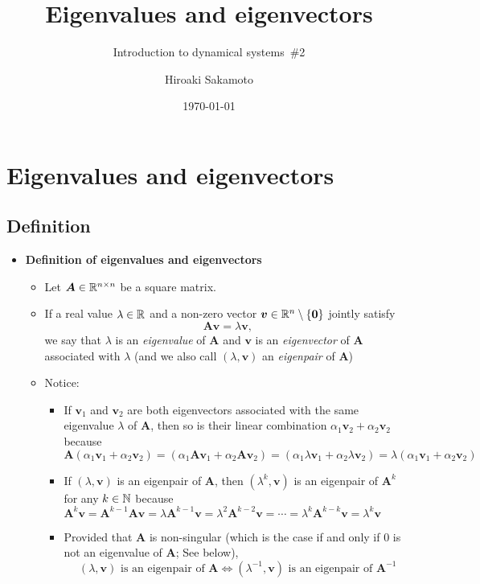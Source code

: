\documentclass[12pt,a4paper]{article}
\title{Eigenvalues and eigenvectors}
\subtitle{Introduction to dynamical systems~\#2}
\author{Hiroaki Sakamoto}
\date{\today}
\begin{document}
\maketitle
\tableofcontents

\section{Eigenvalues and eigenvectors}

\subsection{Definition}

\begin{itemize}

\item \textbf{Definition of eigenvalues and eigenvectors}
  \begin{itemize}
  \item Let $\bm{A}\in \mathbb{R}^{n\times n}$ be a square matrix.
  \item If a real value $\lambda\in \mathbb{R}$
    and a non-zero vector $\bm{v}\in\mathbb{R}^{n}\setminus\{\bm{0}\}$ jointly satisfy
    \begin{equation}\nonumber%
      \bm{A}\bm{v} = \lambda \bm{v},
    \end{equation}
    we say that $\lambda$ is an \emph{eigenvalue} of $\bm{A}$
    and $\bm{v}$ is an \emph{eigenvector} of $\bm{A}$ associated with $\lambda$
    (and we also call $(\lambda, \bm{v})$ an \emph{eigenpair} of $\bm{A}$)
  \item Notice:
    \begin{itemize}
    \item If $\bm{v}_{1}$ and $\bm{v}_{2}$ are both eigenvectors associated with the same eigenvalue $\lambda$ of $\bm{A}$,
      then so is their linear combination $\alpha_{1}\bm{v}_{2}+ \alpha_{2}\bm{v}_{2}$ because
      \begin{equation}\nonumber%
        \bm{A}\left(\alpha_{1}\bm{v}_{1}+ \alpha_{2}\bm{v}_{2}\right)
        = \left(\alpha_{1}\bm{A}\bm{v}_{1}+ \alpha_{2}\bm{A}\bm{v}_{2}\right)
        = \left(\alpha_{1}\lambda\bm{v}_{1}+ \alpha_{2}\lambda\bm{v}_{2}\right)
        = \lambda \left(\alpha_{1}\bm{v}_{1}+ \alpha_{2}\bm{v}_{2}\right)
      \end{equation}
    \item If $(\lambda, \bm{v})$ is an eigenpair of $\bm{A}$,
      then $(\lambda^{k}, \bm{v})$ is an eigenpair of $\bm{A}^{k}$ for any $k\in \mathbb{N}$
      because
      $\bm{A}^{k}\bm{v} = \bm{A}^{k-1}\bm{A}\bm{v}  = \lambda\bm{A}^{k-1}\bm{v} = \lambda^{2}\bm{A}^{k-2}\bm{v} = \cdots = \lambda^{k}\bm{A}^{k-k}\bm{v} = \lambda^{k}\bm{v}$
    \item Provided that $\bm{A}$ is non-singular (which is the case if and only if $0$ is not an eigenvalue of $\bm{A}$; See below),
      \begin{equation}\nonumber%
        \text{$(\lambda,\bm{v})$ is an eigenpair of $\bm{A}$}
        \iff
        \text{$(\lambda^{-1}, \bm{v})$ is an eigenpair of $\bm{A}^{-1}$}
      \end{equation}


\end{itemize}
\end{itemize}
\end{itemize}
\end{document}
